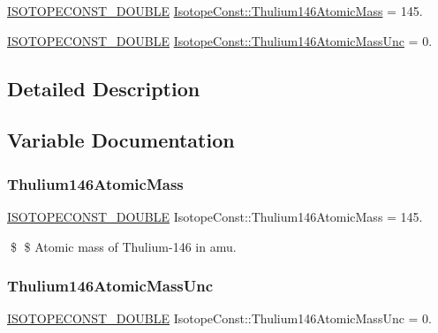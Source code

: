 \begin{DoxyCompactItemize}
\item 
\mbox{\hyperlink{group___isotope_const-_macros_ga8f45a7272ce02c0b4c65c44636ed719a}{I\+S\+O\+T\+O\+P\+E\+C\+O\+N\+S\+T\+\_\+\+D\+O\+U\+B\+LE}} \mbox{\hyperlink{group___isotope_const-_thulium-_tm146_ga08b2ada6aaeec743709d839dc0021898}{Isotope\+Const\+::\+Thulium146\+Atomic\+Mass}} = 145.
\item 
\mbox{\hyperlink{group___isotope_const-_macros_ga8f45a7272ce02c0b4c65c44636ed719a}{I\+S\+O\+T\+O\+P\+E\+C\+O\+N\+S\+T\+\_\+\+D\+O\+U\+B\+LE}} \mbox{\hyperlink{group___isotope_const-_thulium-_tm146_gaa97de193bbf0d186080a756924860883}{Isotope\+Const\+::\+Thulium146\+Atomic\+Mass\+Unc}} = 0.
\end{DoxyCompactItemize}


\subsection{Detailed Description}


\subsection{Variable Documentation}
\mbox{\label{group___isotope_const-_thulium-_tm146_ga08b2ada6aaeec743709d839dc0021898}} 
\subsubsection{\texorpdfstring{Thulium146\+Atomic\+Mass}{Thulium146AtomicMass}}
{\footnotesize\ttfamily \mbox{\hyperlink{group___isotope_const-_macros_ga8f45a7272ce02c0b4c65c44636ed719a}{I\+S\+O\+T\+O\+P\+E\+C\+O\+N\+S\+T\+\_\+\+D\+O\+U\+B\+LE}} Isotope\+Const\+::\+Thulium146\+Atomic\+Mass = 145.}

\$ \$ Atomic mass of Thulium-\/146 in amu. \mbox{\label{group___isotope_const-_thulium-_tm146_gaa97de193bbf0d186080a756924860883}} 
\subsubsection{\texorpdfstring{Thulium146\+Atomic\+Mass\+Unc}{Thulium146AtomicMassUnc}}
{\footnotesize\ttfamily \mbox{\hyperlink{group___isotope_const-_macros_ga8f45a7272ce02c0b4c65c44636ed719a}{I\+S\+O\+T\+O\+P\+E\+C\+O\+N\+S\+T\+\_\+\+D\+O\+U\+B\+LE}} Isotope\+Const\+::\+Thulium146\+Atomic\+Mass\+Unc = 0.}

